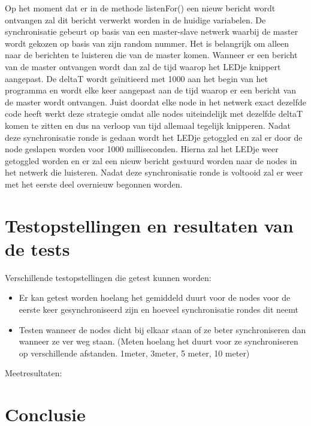 \documentclass{article}
\begin{document}
Op het moment dat er in de methode listenFor() een nieuw bericht wordt ontvangen zal dit bericht verwerkt worden in de huidige variabelen. De synchronisatie gebeurt op basis van een master-slave netwerk waarbij de master wordt gekozen op basis van zijn random nummer. Het is belangrijk om alleen naar de berichten te luisteren die van de master komen. 
Wanneer er een bericht van de master ontvangen wordt dan zal de tijd waarop het LEDje knippert aangepast. De deltaT wordt ge\"{i}nitieerd met 1000 aan het begin van het programma en wordt elke keer aangepast aan de tijd waarop er een bericht van de master wordt ontvangen. Juist doordat elke node in het netwerk exact dezelfde code heeft werkt deze strategie omdat alle nodes uiteindelijk met dezelfde deltaT komen te zitten en dus na verloop van tijd allemaal tegelijk knipperen. Nadat deze synchronisatie ronde is gedaan wordt het LEDje getoggled en zal er door de node geslapen worden voor 1000 milliseconden. Hierna zal het LEDje weer getoggled worden en er zal een nieuw bericht gestuurd worden naar de nodes in het netwerk die luisteren. Nadat deze synchronisatie ronde is voltooid zal er weer met het eerste deel overnieuw begonnen worden. 
\section{Testopstellingen en resultaten van de tests}
Verschillende testopstellingen die getest kunnen worden:
\begin{itemize}
	\item Er kan getest worden hoelang het gemiddeld duurt voor de nodes voor de eerste keer gesynchroniseerd zijn en hoeveel synchronisatie rondes dit neemt
	\item Testen wanneer de nodes dicht bij elkaar staan of ze beter synchroniseren dan wanneer ze ver weg staan. (Meten hoelang het duurt voor ze synchroniseren op verschillende afstanden. 1meter, 3meter, 5 meter, 10 meter)
\end{itemize}
Meetresultaten:

\section{Conclusie}
\end{document}
